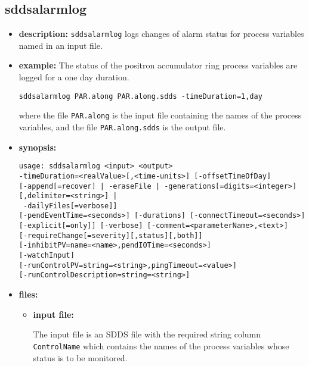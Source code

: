 %
%
\begin{latexonly}
\newpage
\end{latexonly}

%
%
\subsection{sddsalarmlog}
\label{sddsalarmlog}

\begin{itemize}
\item {\bf description:}
%
%
\verb+sddsalarmlog+ logs changes of alarm status for process variables named in an input file.
\item {\bf example:} 
%
% 
%
The status of the positron accumulator ring process variables are logged
for a one day duration.
\begin{verbatim}
sddsalarmlog PAR.along PAR.along.sdds -timeDuration=1,day
\end{verbatim}
where the file \verb+PAR.along+ is the input file containing the names of the
process variables, and the file \verb+PAR.along.sdds+ is the output file.

\item {\bf synopsis:} 
%
%
\begin{verbatim}
usage: sddsalarmlog <input> <output>
-timeDuration=<realValue>[,<time-units>] [-offsetTimeOfDay]
[-append[=recover] | -eraseFile | -generations[=digits=<integer>][,delimiter=<string>] |
 -dailyFiles[=verbose]]
[-pendEventTime=<seconds>] [-durations] [-connectTimeout=<seconds>]
[-explicit[=only]] [-verbose] [-comment=<parameterName>,<text>]
[-requireChange[=severity][,status][,both]]
[-inhibitPV=name=<name>,pendIOTime=<seconds>]
[-watchInput]
[-runControlPV=string=<string>,pingTimeout=<value>]
[-runControlDescription=string=<string>]
\end{verbatim}

\item {\bf files:}
\begin{itemize}
\item {\bf input file:}\par
The input file is an SDDS file with the required string column {\tt ControlName}
which contains the names of the process variables whose status is to be monitored.


\end{itemize}
\end{itemize}
